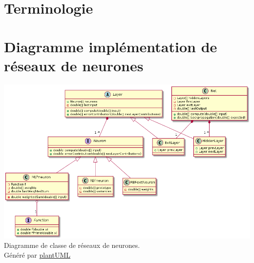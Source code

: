 \documentclass[12pt,a4paper,oneside, titlepage]{article}
\begin{document}
\appendix
\section{Terminologie}
\terminologie
\section{Diagramme implémentation de réseaux de neurones}\label{uml}
\includegraphics[width=\textwidth]{../../uml/neurondiag.png}
Diagramme de classe de réseaux de neurones.\\Généré par \href{http://plantuml.com/class-diagram}{plantUML}
\end{document}

